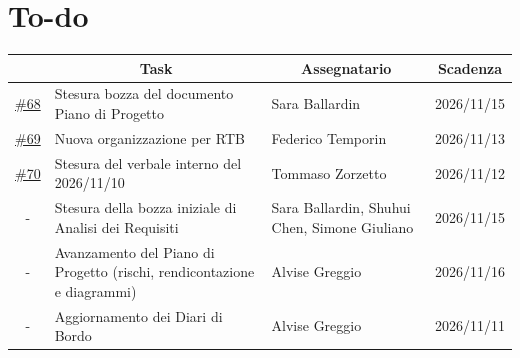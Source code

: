 \documentclass[11pt, a4paper]{article}
\begin{document}
\section{To-do}
\begin{table}[h]
    \centering
    \renewcommand{\arraystretch}{1.5}
    \begin{tabularx}{\textwidth}{|c|X|p{3.15cm}|c|}
        \hline
        \rowcolor{gray!10} 
        \multicolumn{1}{|c|}{\textbf{ID issue}} & 
        \multicolumn{1}{c|}{\textbf{Task}} & 
        \multicolumn{1}{c|}{\textbf{Assegnatario}} & 
        \multicolumn{1}{c|}{\textbf{Scadenza}} \\
        \hline
        \href{https://github.com/On-By-One-Team/On-By-One.github.io/issues/68}{\#68} & Stesura bozza del documento Piano di Progetto & Sara Ballardin & 2026/11/15 \\
        \hline
        \href{https://github.com/On-By-One-Team/On-By-One.github.io/issues/69}{\#69} & Nuova organizzazione per RTB & Federico Temporin & 2026/11/13 \\
        \hline
        \href{https://github.com/On-By-One-Team/On-By-One.github.io/issues/70}{\#70} & Stesura del verbale interno del 2026/11/10 & Tommaso Zorzetto & 2026/11/12 \\
        \hline
        - & Stesura della bozza iniziale di Analisi dei Requisiti & Sara Ballardin, Shuhui Chen, Simone Giuliano & 2026/11/15 \\
        \hline
        - & Avanzamento del Piano di Progetto (rischi, rendicontazione e diagrammi) & Alvise Greggio & 2026/11/16 \\
        \hline
        - & Aggiornamento dei Diari di Bordo & Alvise Greggio & 2026/11/11 \\
        \hline
    \end{tabularx}
\end{table}
\end{document}
